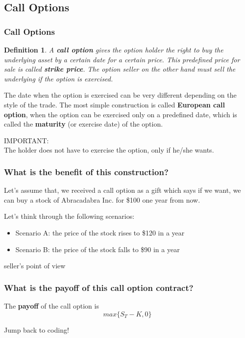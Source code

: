 \documentclass[ignorenonframetext, 9pt]{beamer}
\newtheorem{de}{Definition}
\begin{document}
\subsection{Call Options}


\begin{frame}
\frametitle{Call Options}

\begin{de}
A \textbf{call option} gives the option holder the right to \textit{buy} the underlying asset by a certain date for a certain price. This predefined price for sale is called \textbf{strike price}. The option seller on the other hand must \textit{sell} the underlying if the option is exercised.
\end{de}

\pause

The date when the option is exercised can be very different depending on the style of the trade. The most simple construction is called \textbf{European call option}, when the option can be exercised only on a predefined date, which is called the \textbf{maturity} (or exercise date) of the option.

\pause

\vfill
\color{red}
IMPORTANT: \\
The holder does not have to exercise the option, only if he/she wants.
\color{black}

\end{frame}

\begin{frame}
\frametitle{What is the benefit of this construction?}

Let's assume that, we received a call option as a gift which says if we want, we can buy a stock of Abracadabra Inc. for \$100 one year from now. \newline

Let's think through the following scenarios:

\begin{itemize}
\item Scenario A: the price of the stock rises to \$120 in a year

\item Scenario B: the price of the stock falls to \$90 in a year
\end{itemize}

\vfill
\centering seller's point of view

\end{frame}

\begin{frame}
\frametitle{What is the payoff of this call option contract?}

The \textbf{payoff} of the call option is 
\begin{equation}
max\lbrace S_T - K, 0\rbrace
\end{equation}

\pause

\vfill
\begin{tcolorbox}[text width=\textwidth/3, boxrule=3pt, colback=mygreen!5!white, colframe=mygreen!75!black]
\textcolor{mygreen!50!black}{Jump back to coding!}
\end{tcolorbox}

\end{frame}
\end{document}
